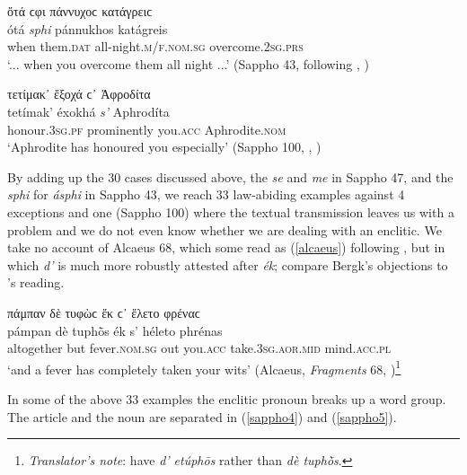 \begin{exe}
\ex ὄτά {ϲφι} πάννυχοϲ κατάγρειϲ\\
\gll ótá \emph{sphi} pánnukhos katágreis\\
when them.\textsc{dat} all-night.\textsc{m/f.nom.sg} overcome.\textsc{2sg.prs}\\
\trans `... when you overcome them all night ...' (Sappho 43, following \citealp[141]{Wackernagel1887}, \citealp[149.1]{LobelPage1968})
\label{sappho2wack}
\end{exe}

\begin{exe}
\ex τετίμακ᾽ ἔξοχά ϲ᾽ Ἀφροδίτα\\
\gll tetímak' éxokhá \emph{s'} Aphrodíta\\
honour.\textsc{3sg.pf} prominently you.\textsc{acc} Aphrodite.\textsc{nom}\\
\trans `Aphrodite has honoured you especially' (Sappho 100, \citealp[Fragment 97]{Hiller1890}, \citealp[112.5]{LobelPage1968})
\label{sappho3weil}
\end{exe}

By adding up the 30 cases discussed above, the \textit{se} and \textit{me} in Sappho 47, and the \textit{sphi} for \textit{ásphi} in Sappho 43, we reach 33 law-abiding examples against 4 exceptions and one (Sappho 100) where the textual transmission leaves us with a problem and we do not even know whether we are dealing with an enclitic. We take no account of Alcaeus 68, which some read as (\ref{alcaeus}) following \citet[175]{Bekker1833}, but in which \textit{d'} is much more robustly attested after \textit{ék}; compare Bergk's \citeyearpar[174]{Bergk1882} objections to \citeauthor{Bekker1833}'s reading.

\begin{exe}
\ex πάμπαν δὲ τυφὼϲ ἔκ ϲ᾽ ἕλετο φρέναϲ\\
\gll pámpan dè tuphṑs ék s' héleto phrénas\\
altogether but fever.\textsc{nom.sg} out you.\textsc{acc} take.\textsc{3sg.aor.mid} mind.\textsc{acc.pl}\\
\trans `and a fever has completely taken your wits' (Alcaeus, \textit{Fragments} 68, \citealp[336.1]{LobelPage1968})\footnote{\emph{Translator's note}: \citet[336.1]{LobelPage1968} have \textit{d' etúphōs} rather than \textit{dè tuphṑs}.}
\label{alcaeus}
\end{exe}

In some of the above 33 examples the enclitic pronoun breaks up a word group. The article and the noun are separated in (\ref{sappho4}) and (\ref{sappho5}).


